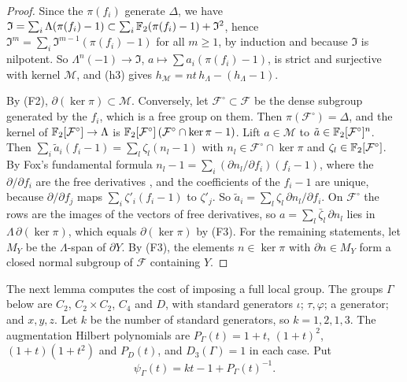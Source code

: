 \begin{proof}
Since the $\pi(f_i)$ generate $\Delta$, we have
$\mathfrak I=\sum_i\Lambda(\pi(f_i)-1)\subset\sum_i\mathbb F_2(\pi(f_i)-1)+\mathfrak I^2$,
hence $\mathfrak I^m=\sum_i\mathfrak I^{m-1}(\pi(f_i)-1)$ for all $m\ge1$, by
induction and because $\mathfrak I$ is nilpotent. So
$\Lambda^n(-1)\to\mathfrak I$, $a\mapsto\sum a_i(\pi(f_i)-1)$, is strict and
surjective with kernel $\mathcal M$, and (h3) gives
$h_{\mathcal M}=nt\,h_\Lambda-(h_\Lambda-1)$.

By (F2), $\partial(\ker\pi)\subset\mathcal M$. Conversely, let
$\mathcal F^\circ\subset\mathcal F$ be the dense subgroup generated by the
$f_i$, which is a free group on them. Then $\pi(\mathcal F^\circ)=\Delta$, and
the kernel of $\mathbb F_2[\mathcal F^\circ]\to\Lambda$ is
$\mathbb F_2[\mathcal F^\circ]\,(\mathcal F^\circ\cap\ker\pi-1)$. Lift
$a\in\mathcal M$ to $\tilde a\in\mathbb F_2[\mathcal F^\circ]^n$. Then
$\sum_i\tilde a_i(f_i-1)=\sum_l\zeta_l(n_l-1)$ with
$n_l\in\mathcal F^\circ\cap\ker\pi$ and $\zeta_l\in\mathbb F_2[\mathcal F^\circ]$.
By Fox's fundamental formula
$n_l-1=\sum_i(\partial n_l/\partial f_i)(f_i-1)$, where the
$\partial/\partial f_i$ are the free derivatives \cite[Section~2]{Fox1953},
and the coefficients of the $f_i-1$ are unique, because $\partial/\partial f_j$
maps $\sum_i\zeta'_i(f_i-1)$ to $\zeta'_j$. So
$\tilde a_i=\sum_l\zeta_l\,\partial n_l/\partial f_i$. On $\mathcal F^\circ$
the rows are the images of the vectors of free derivatives, so
$a=\sum_l\bar\zeta_l\,\partial n_l$ lies in $\Lambda\,\partial(\ker\pi)$, which
equals $\partial(\ker\pi)$ by (F3). For the remaining statements, let $M_Y$ be
the $\Lambda$-span of $\partial Y$. By (F3), the elements $n\in\ker\pi$ with
$\partial n\in M_Y$ form a closed normal subgroup of $\mathcal F$ containing
$Y$.
\end{proof}

The next lemma computes the cost of imposing a full local group. The groups
$\Gamma$ below are $C_2$, $C_2\times C_2$, $C_4$ and $D$, with standard
generators $\iota$; $\tau,\varphi$; a generator; and $x,y,z$. Let $k$ be the
number of standard generators, so $k=1,2,1,3$. The augmentation Hilbert
polynomials are $P_\Gamma(t)=1+t$, $(1+t)^2$, $(1+t)(1+t^2)$ and $P_D(t)$,
and $D_3(\Gamma)=1$ in each case. Put
\[
 \psi_\Gamma(t)=kt-1+P_\Gamma(t)^{-1}.
\]

